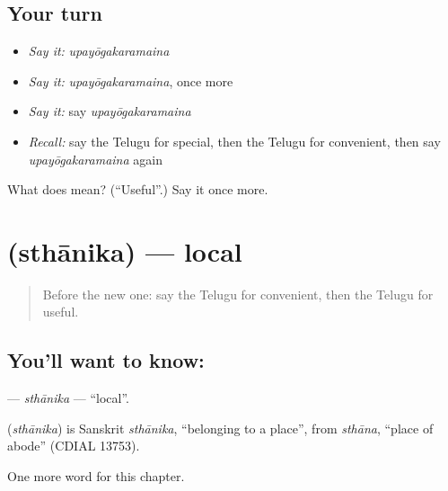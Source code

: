 \subsection*{Your turn}
\begin{itemize}
\raggedright
  \item \emph{Say it:} \emph{upayōgakaramaina}
  \item \emph{Say it:} \emph{upayōgakaramaina}, once more
  \item \emph{Say it:} say \emph{upayōgakaramaina}
  \item \emph{Recall:} say the Telugu for special, then the Telugu for convenient, then say \emph{upayōgakaramaina} again
\end{itemize}

\begin{tcolorbox}[breakable,colback=teal!4,colframe=teal!35!black,title={Before you move on}]
What does  mean? (\textquotedblleft{}Useful\textquotedblright{}.) Say it once more.
\end{tcolorbox}
\section[\texorpdfstring{\te{స్థానిక} (sthānika)}{స్థానిక (sthānika)}]{ (sthānika) — local}

\label{lesson:TE-C296-sthanika}



\begin{quote}
Before the new one: say the Telugu for convenient, then the Telugu for useful.
\end{quote}

\subsection*{You'll want to know: }
\textbf{} — \emph{sthānika} — \textquotedblleft{}local\textquotedblright{}.

\begin{cousinweb}
\textbf{} (\emph{sthānika}) is Sanskrit \emph{sthānika}, \textquotedblleft{}belonging to a place\textquotedblright{}, from \emph{sthāna}, \textquotedblleft{}place of abode\textquotedblright{} (CDIAL 13753).
\end{cousinweb}

\begin{grammarlens}[title={What you've built}]
One more word for this chapter.
\end{grammarlens}

